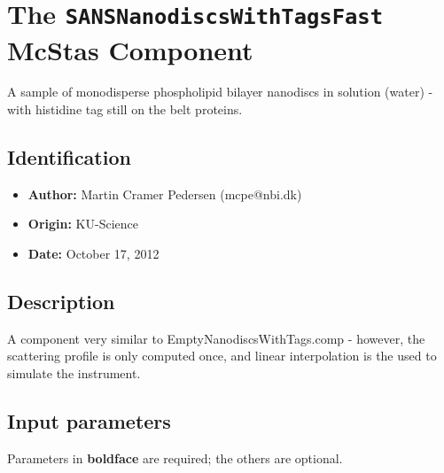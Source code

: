 \section{The \texttt{SANSNanodiscsWithTagsFast} McStas Component}
A sample of monodisperse phospholipid bilayer nanodiscs in solution (water) - with
histidine tag still on the belt proteins.

\subsection*{Identification}
\begin{itemize}
  \item \textbf{Author:} Martin Cramer Pedersen (mcpe@nbi.dk)
  \item \textbf{Origin:} KU-Science
  \item \textbf{Date:} October 17, 2012
\end{itemize}

\subsection*{Description}
A component very similar to EmptyNanodiscsWithTags.comp - however, the scattering profile is only computed once, and linear interpolation is the used to simulate the instrument.

\subsection*{Input parameters}
Parameters in \textbf{boldface} are required; the others are optional.

